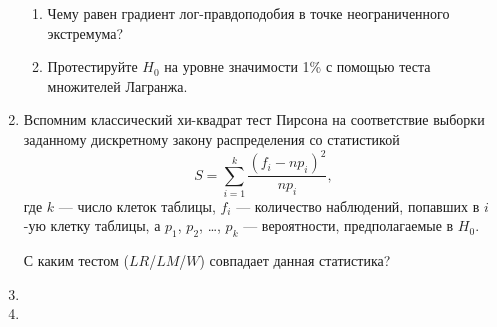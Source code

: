 \begin{enumerate}[resume]
    \begin{enumerate}
        \item Чему равен градиент лог-правдоподобия в точке неограниченного экстремума?
        \item Протестируйте $H_0$ на уровне значимости 1\% с помощью теста множителей Лагранжа.
    \end{enumerate}

    \item Вспомним классический хи-квадрат тест Пирсона на соответствие выборки заданному дискретному закону распределения со 
    статистикой 
    \[
    S = \sum_{i=1}^k \frac{(f_i - np_i)^2}{np_i},
    \]
    где $k$ — число клеток таблицы, $f_i$ — количество наблюдений, попавших в $i$-ую клетку таблицы, а $p_1$, $p_2$, \dots, $p_k$ — вероятности, предполагаемые в $H_0$.
    
    С каким тестом ($LR$/$LM$/$W$) совпадает данная статистика?
    
    
    \item 

    \item \end{enumerate}

